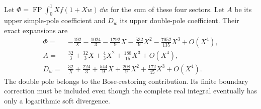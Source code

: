 Let $\Phi=\operatorname{FP}\int_0^1X f(1+Xw)\,\dd w$
for the sum of these four sectors. Let $A$ be its upper simple-pole
coefficient and $D_w$ its upper double-pole coefficient. Their
exact expansions are
\begin{align}
 \Phi={}&-\frac{192}{X}-\frac{1024}{3}-\frac{1792}{9}X
             -\frac{532}{9}X^2-\frac{7052}{135}X^3+O(X^4),\\
 A={}&\frac{32}{3}+\frac{32}{3}X+\frac43X^2
                            +\frac{188}{15}X^3+O(X^4),\\
 D_w={}&\frac{32}{X}+\frac{224}{3}+\frac{544}{9}X
                     +\frac{208}{9}X^2+\frac{172}{45}X^3+O(X^4).
\end{align}
The double pole belongs to the Bose-restoring contribution. Its
finite boundary correction must be included even though the
complete real integral eventually has only a logarithmic soft
divergence.


